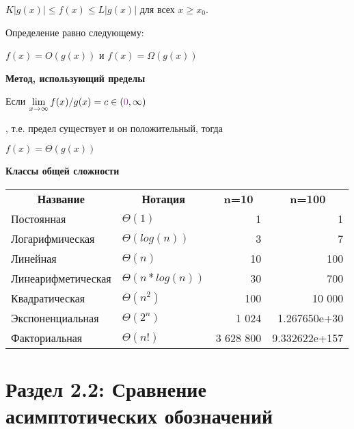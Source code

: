 {\vspace{\baselineskip}

$K|g(x)| \leqslant f(x) \leqslant L|g(x)|$ для всех $x \geqslant x_0$.

\vspace{\baselineskip}

Определение равно следующему:

\vspace{\baselineskip}

$f(x) = O(g(x))$ и $f(x) = \Omega(g(x))$

\vspace{\baselineskip}

\textbf{Метод, использующий пределы}

\vspace{\baselineskip}

Если $\lim\limits_{x \to \infty} f(x)/g(x) = c \in ({\textcolor{Purple}{0}},\infty)$}, т.е. предел существует и он положительный, тогда 

$f(x) = \Theta(g(x))$

\vspace{\baselineskip}

\textbf{Классы общей сложности}

\vspace{\baselineskip}

\begin{tabular}{llrr}
\multicolumn{1}{c}{\textbf{Название}}& \multicolumn{1}{c}{\textbf{Нотация}} & \multicolumn{1}{c}{\textbf{n=10}} & \multicolumn{1}{c}{\textbf{n=100}} \\[5pt]
\ttfamily Постоянная & $\Theta(1)$ & 1 & 1\\[5pt]
\ttfamily Логарифмическая & $\Theta(log(n))$ & 3 & 7\\[5pt]
\ttfamily Линейная & $\Theta(n)$ & 10 & 100\\[5pt]
\ttfamily Линеарифметическая & $\Theta(n*log(n))$ & 30 & 700\\[5pt]
\ttfamily Квадратическая & $\Theta(n^2)$ & 100 & 10 000\\[5pt]
\ttfamily Экспоненциальная & $\Theta(2^n)$ & 1 024 & 1.267650e+30\\[5pt]
\ttfamily Факториальная & $\Theta(n!)$ & 3 628 800 & 9.332622e+157 \\[5pt]
\end{tabular}

\section*{Раздел 2.2: Сравнение асимптотических обозначений}

